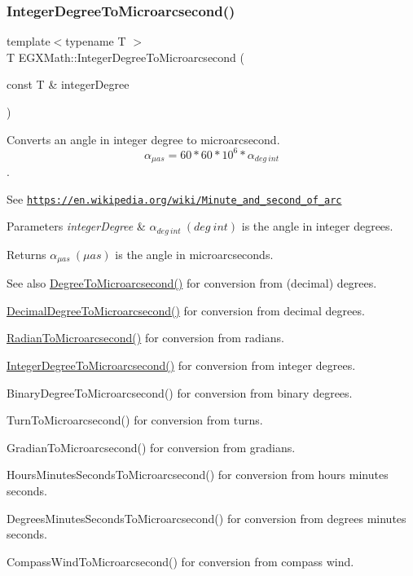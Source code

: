 \subsubsection{\texorpdfstring{Integer\+Degree\+To\+Microarcsecond()}{IntegerDegreeToMicroarcsecond()}}
{\footnotesize\ttfamily template$<$typename T $>$ \\
T E\+G\+X\+Math\+::\+Integer\+Degree\+To\+Microarcsecond (\begin{DoxyParamCaption}\item[{const T \&}]{integer\+Degree }\end{DoxyParamCaption})}



Converts an angle in integer degree to microarcsecond. \[\alpha_{\mu as}=60 * 60 * 10^6 * \alpha_{deg\ int}\]. 

See \href{https://en.wikipedia.org/wiki/Minute_and_second_of_arc}{\tt https\+://en.\+wikipedia.\+org/wiki/\+Minute\+\_\+and\+\_\+second\+\_\+of\+\_\+arc} 
\begin{DoxyParams}{Parameters}
{\em integer\+Degree} & $\alpha_{deg\ int}\ (deg\ int)$ is the angle in integer degrees. \\
\hline
\end{DoxyParams}
\begin{DoxyReturn}{Returns}
$\alpha_{\mu as}\ (\mu as)$ is the angle in microarcseconds. 
\end{DoxyReturn}
\begin{DoxySeeAlso}{See also}
\mbox{\hyperlink{group___e_g_x_math-_angle_conversions-_degree_ga31b65388fe1b4656663b3d66b9d764e6}{Degree\+To\+Microarcsecond()}} for conversion from (decimal) degrees. 

\mbox{\hyperlink{group___e_g_x_math-_angle_conversions-_decimal_degree_ga6fa88456069907fd24716fa575517571}{Decimal\+Degree\+To\+Microarcsecond()}} for conversion from decimal degrees. 

\mbox{\hyperlink{group___e_g_x_math-_angle_conversions-_radian_ga3a515ca2838a305fa40750763f546a86}{Radian\+To\+Microarcsecond()}} for conversion from radians. 

\mbox{\hyperlink{group___e_g_x_math-_angle_conversions-_integer_degree_ga69179d6082764595c7014805e1f6b31e}{Integer\+Degree\+To\+Microarcsecond()}} for conversion from integer degrees. 

Binary\+Degree\+To\+Microarcsecond() for conversion from binary degrees. 

Turn\+To\+Microarcsecond() for conversion from turns. 

Gradian\+To\+Microarcsecond() for conversion from gradians. 

Hours\+Minutes\+Seconds\+To\+Microarcsecond() for conversion from hours minutes seconds. 

Degrees\+Minutes\+Seconds\+To\+Microarcsecond() for conversion from degrees minutes seconds. 

Compass\+Wind\+To\+Microarcsecond() for conversion from compass wind. 
\end{DoxySeeAlso}
